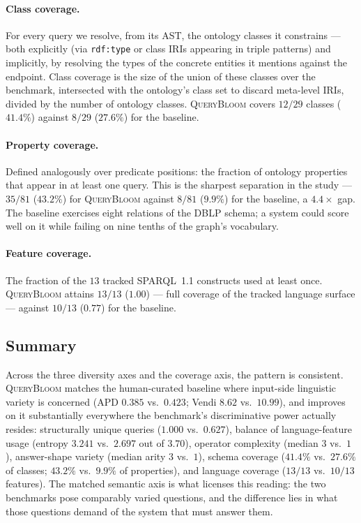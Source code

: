 \paragraph{Class coverage.} For every query we resolve, from its AST, the ontology classes
it constrains --- both explicitly (via \texttt{rdf:type} or class IRIs appearing in triple
patterns) and implicitly, by resolving the types of the concrete entities it mentions
against the endpoint. Class coverage is the size of the union of these classes over the
benchmark, intersected with the ontology's class set to discard meta-level IRIs, divided by
the number of ontology classes. \textsc{QueryBloom} covers $12/29$ classes ($41.4\%$)
against $8/29$ ($27.6\%$) for the baseline.

\paragraph{Property coverage.} Defined analogously over predicate positions: the fraction of
ontology properties that appear in at least one query. This is the sharpest separation in
the study --- $35/81$ ($43.2\%$) for \textsc{QueryBloom} against $8/81$ ($9.9\%$) for the
baseline, a $4.4\times$ gap. The baseline exercises eight relations of the DBLP schema;
a system could score well on it while failing on nine tenths of the graph's vocabulary.

\paragraph{Feature coverage.} The fraction of the $13$ tracked SPARQL~1.1 constructs used at
least once. \textsc{QueryBloom} attains $13/13$ ($1.00$) --- full coverage of the tracked
language surface --- against $10/13$ ($0.77$) for the baseline.

\subsection{Summary}

Across the three diversity axes and the coverage axis, the pattern is consistent.
\textsc{QueryBloom} matches the human-curated baseline where input-side linguistic variety is
concerned (APD $0.385$ vs.\ $0.423$; Vendi $8.62$ vs.\ $10.99$), and improves on it
substantially everywhere the benchmark's discriminative power actually resides: structurally
unique queries ($1.000$ vs.\ $0.627$), balance of language-feature usage (entropy $3.241$
vs.\ $2.697$ out of $3.70$), operator complexity (median $3$ vs.\ $1$), answer-shape variety
(median arity $3$ vs.\ $1$), schema coverage ($41.4\%$ vs.\ $27.6\%$ of classes; $43.2\%$
vs.\ $9.9\%$ of properties), and language coverage ($13/13$ vs.\ $10/13$ features). The
matched semantic axis is what licenses this reading: the two benchmarks pose comparably
varied questions, and the difference lies in what those questions demand of the system that
must answer them.
